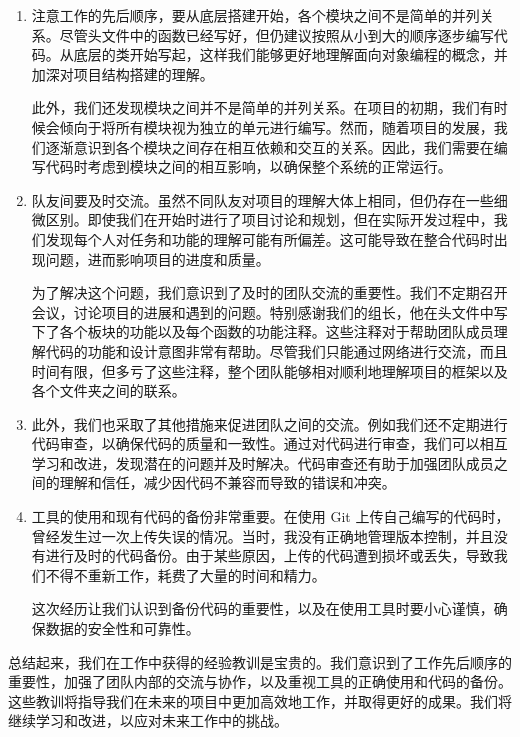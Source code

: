 \documentclass[12pt]{article}
\begin{document}
\begin{enumerate}
  \item 注意工作的先后顺序，要从底层搭建开始，各个模块之间不是简单的并列关系。尽管头文件中的函数已经写好，但仍建议按照从小到大的顺序逐步编写代码。从底层的类开始写起，这样我们能够更好地理解面向对象编程的概念，并加深对项目结构搭建的理解。

        此外，我们还发现模块之间并不是简单的并列关系。在项目的初期，我们有时候会倾向于将所有模块视为独立的单元进行编写。然而，随着项目的发展，我们逐渐意识到各个模块之间存在相互依赖和交互的关系。因此，我们需要在编写代码时考虑到模块之间的相互影响，以确保整个系统的正常运行。

  \item 队友间要及时交流。虽然不同队友对项目的理解大体上相同，但仍存在一些细微区别。即使我们在开始时进行了项目讨论和规划，但在实际开发过程中，我们发现每个人对任务和功能的理解可能有所偏差。这可能导致在整合代码时出现问题，进而影响项目的进度和质量。

        为了解决这个问题，我们意识到了及时的团队交流的重要性。我们不定期召开会议，讨论项目的进展和遇到的问题。特别感谢我们的组长，他在头文件中写下了各个板块的功能以及每个函数的功能注释。这些注释对于帮助团队成员理解代码的功能和设计意图非常有帮助。尽管我们只能通过网络进行交流，而且时间有限，但多亏了这些注释，整个团队能够相对顺利地理解项目的框架以及各个文件夹之间的联系。

  \item 此外，我们也采取了其他措施来促进团队之间的交流。例如我们还不定期进行代码审查，以确保代码的质量和一致性。通过对代码进行审查，我们可以相互学习和改进，发现潜在的问题并及时解决。代码审查还有助于加强团队成员之间的理解和信任，减少因代码不兼容而导致的错误和冲突。

  \item 工具的使用和现有代码的备份非常重要。在使用 Git 上传自己编写的代码时，曾经发生过一次上传失误的情况。当时，我没有正确地管理版本控制，并且没有进行及时的代码备份。由于某些原因，上传的代码遭到损坏或丢失，导致我们不得不重新工作，耗费了大量的时间和精力。

        这次经历让我们认识到备份代码的重要性，以及在使用工具时要小心谨慎，确保数据的安全性和可靠性。
\end{enumerate}

总结起来，我们在工作中获得的经验教训是宝贵的。我们意识到了工作先后顺序的重要性，加强了团队内部的交流与协作，以及重视工具的正确使用和代码的备份。这些教训将指导我们在未来的项目中更加高效地工作，并取得更好的成果。我们将继续学习和改进，以应对未来工作中的挑战。
\end{document}

